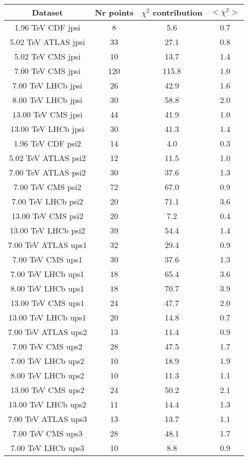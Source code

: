 \begin{table}[h!]
\centering
\begin{tabular}{c|c|c|c}
Dataset & Nr points & $\chi^2$ contribution & $<\chi^2>$ \\
\hline
1.96 TeV CDF jpsi & 8 & 5.6 & 0.7 \\
5.02 TeV ATLAS jpsi & 33 & 27.1 & 0.8 \\
5.02 TeV CMS jpsi & 10 & 13.7 & 1.4 \\
7.00 TeV CMS jpsi & 120 & 115.8 & 1.0 \\
7.00 TeV LHCb jpsi & 26 & 42.9 & 1.6 \\
8.00 TeV LHCb jpsi & 30 & 58.8 & 2.0 \\
13.00 TeV CMS jpsi & 44 & 41.9 & 1.0 \\
13.00 TeV LHCb jpsi & 30 & 41.3 & 1.4 \\
1.96 TeV CDF psi2 & 14 & 4.0 & 0.3 \\
5.02 TeV ATLAS psi2 & 12 & 11.5 & 1.0 \\
7.00 TeV ATLAS psi2 & 30 & 37.6 & 1.3 \\
7.00 TeV CMS psi2 & 72 & 67.0 & 0.9 \\
7.00 TeV LHCb psi2 & 20 & 71.1 & 3.6 \\
13.00 TeV CMS psi2 & 20 & 7.2 & 0.4 \\
13.00 TeV LHCb psi2 & 39 & 54.4 & 1.4 \\
7.00 TeV ATLAS ups1 & 32 & 29.4 & 0.9 \\
7.00 TeV CMS ups1 & 30 & 37.6 & 1.3 \\
7.00 TeV LHCb ups1 & 18 & 65.4 & 3.6 \\
8.00 TeV LHCb ups1 & 18 & 70.7 & 3.9 \\
13.00 TeV CMS ups1 & 24 & 47.7 & 2.0 \\
13.00 TeV LHCb ups1 & 20 & 14.8 & 0.7 \\
7.00 TeV ATLAS ups2 & 13 & 11.4 & 0.9 \\
7.00 TeV CMS ups2 & 28 & 47.5 & 1.7 \\
7.00 TeV LHCb ups2 & 10 & 18.9 & 1.9 \\
8.00 TeV LHCb ups2 & 10 & 11.3 & 1.1 \\
13.00 TeV CMS ups2 & 24 & 50.2 & 2.1 \\
13.00 TeV LHCb ups2 & 11 & 14.4 & 1.3 \\
7.00 TeV ATLAS ups3 & 13 & 13.7 & 1.1 \\
7.00 TeV CMS ups3 & 28 & 48.1 & 1.7 \\
7.00 TeV LHCb ups3 & 10 & 8.8 & 0.9 \\

\end{tabular}
\end{table}
